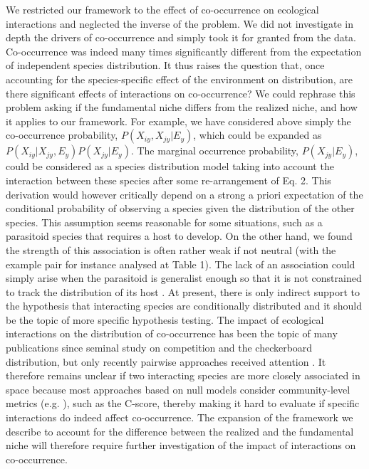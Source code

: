 \documentclass[12pt]{article}
\begin{document}
We restricted our framework to the effect of co-occurrence on ecological
interactions and neglected the inverse of the problem. We did not investigate
in depth the drivers of co-occurrence and simply took it for granted from the
data. Co-occurrence was indeed many times significantly different from the
expectation of independent species distribution. It thus raises the question
that, once accounting for the species-specific effect of the environment on
distribution, are there significant effects of interactions on co-occurrence?
We could rephrase this problem asking if the fundamental niche differs from
the realized niche, and how it applies to our framework. For example, we have
considered above simply the co-occurrence probability, $P(X_{iy},X_{jy}|E_y)$,
which could be expanded as $P(X_{iy}|X_{jy},E_y) P(X_{jy}| E_y )$. The
marginal occurrence probability, $P(X_{jy}|E_y )$, could be considered as a
species distribution model taking into account the interaction between these
species after some re-arrangement of Eq. 2. This derivation would however
critically depend on a strong a priori expectation of the conditional
probability of observing a species given the distribution of the other
species. This assumption seems reasonable for some situations, such as a
parasitoid species that requires a host to develop. On the other hand, we
found the strength of this association is often rather weak if not neutral
(with the example pair for instance analysed at Table 1). The lack of an
association could simply arise when the parasitoid is generalist enough so
that it is not constrained to track the distribution of its host
\citep{Cazelles2015}. At present, there is only indirect support to the
hypothesis that interacting species are conditionally distributed and it
should be the topic of more specific hypothesis testing. The impact of
ecological interactions on the distribution of co-occurrence has been the
topic of many publications since \citealt{Diamond1975} seminal study on
competition and the checkerboard distribution, but only recently pairwise
approaches received attention \citep{Veech2013}. It therefore remains unclear
if two interacting species are more closely associated in space because most
approaches based on null models consider community-level metrics (e.g.
\citealt{Gotelli2000}), such as the C-score, thereby making it hard to
evaluate if specific interactions do indeed affect co-occurrence. The
expansion of the framework we describe to account for the difference between
the realized and the fundamental niche will therefore require further
investigation of the impact of interactions on co-occurrence.
\end{document}
